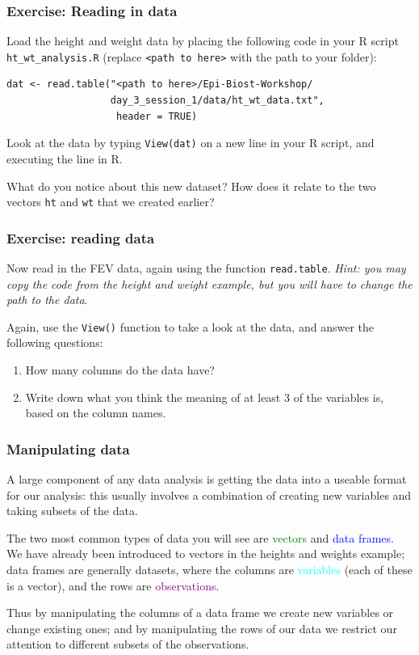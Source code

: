 \documentclass[11pt,dvipsnames]{beamer}
\newcommand{\myframe}[1]{\begin{frame} \frametitle{#1}}
\begin{document}
\begin{frame}[fragile]
\frametitle{Exercise: Reading in data}

Load the height and weight data by placing the following code in your R script \texttt{ht\_wt\_analysis.R} (replace \texttt{<path to here>} with the path to your folder):

{\small
\begin{verbatim}
dat <- read.table("<path to here>/Epi-Biost-Workshop/
                  day_3_session_1/data/ht_wt_data.txt",
                   header = TRUE)
\end{verbatim}
}

Look at the data by typing \texttt{View(dat)} on a new line in your R script, and executing the line in R. 

What do you notice about this new dataset? How does it relate to the two vectors \texttt{ht} and \texttt{wt} that we created earlier?
\end{frame}

\begin{frame}
\frametitle{Exercise: reading data}
Now read in the FEV data, again using the function \texttt{read.table}. \textit{Hint: you may copy the code from the height and weight example, but you will have to change the path to the data}.

Again, use the \texttt{View()} function to take a look at the data, and answer the following questions:
\begin{enumerate}
\item How many columns do the data have?
\item Write down what you think the meaning of at least 3 of the variables is, based on the column names.
\end{enumerate}  
\end{frame}

\myframe{Manipulating data}
A large component of any data analysis is getting the data into a useable format for our analysis: this usually involves a combination of creating new variables and taking subsets of the data.

The two most common types of data you will see are \textcolor{green}{vectors} and \textcolor{blue}{data frames}. We have already been introduced to vectors in the heights and weights example; data frames are generally datasets, where the columns are \textcolor{cyan}{variables} (each of these is a vector), and the rows are \textcolor{purple}{observations}.

Thus by manipulating the columns of a data frame we create new variables or change existing ones; and by manipulating the rows of our data we restrict our attention to different subsets of the observations.
\end{frame}
\end{document}
